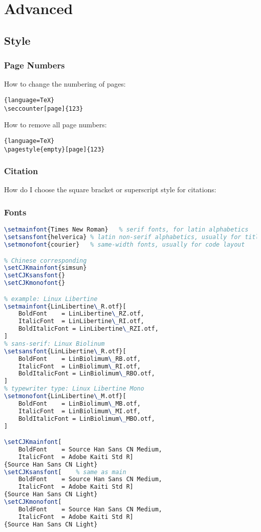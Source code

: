 \chapter{Advanced}
\label{chap:Advanced}

\section{Style}

\subsection{Page Numbers}
How to change the numbering of pages:
\begin{lstlisting}{language=TeX}
\seccounter[page]{123}
\end{lstlisting}

How to remove all page numbers:
\begin{lstlisting}{language=TeX}
\pagestyle{empty}[page]{123}
\end{lstlisting}

\subsection{Citation}
How do I choose the square bracket or superscript style for citations:

\subsection{Fonts}
\begin{lstlisting}[language=TeX]
\setmainfont{Times New Roman}	% serif fonts, for latin alphabetics
\setsansfont{helverica}	% latin non-serif alphabetics, usually for titles
\setmonofont{courier}	% same-width fonts, usually for code layout

% Chinese corresponding
\setCJKmainfont{simsun}
\setCJKsansfont{}
\setCJKmonofont{}   

% example: Linux Libertine
\setmainfont{LinLibertine\_R.otf}[
    BoldFont	= LinLibertine\_RZ.otf,
    ItalicFont	= LinLibertine\_RI.otf,
    BoldItalicFont = LinLibertine\_RZI.otf,
]
% sans-serif: Linux Biolinum
\setsansfont{LinLibertine\_R.otf}[
    BoldFont	= LinBiolimum\_RB.otf,
    ItalicFont	= LinBiolimum\_RI.otf,
    BoldItalicFont = LinBiolimum\_RBO.otf,
]
% typewriter type: Linux Libertine Mono
\setmonofont{LinLibertine\_M.otf}[
    BoldFont	= LinBiolimum\_MB.otf,
    ItalicFont	= LinBiolimum\_MI.otf,
    BoldItalicFont = LinBiolimum\_MBO.otf,
]

\setCJKmainfont[
    BoldFont	= Source Han Sans CN Medium,
    ItalicFont	= Adobe Kaiti Std R]
{Source Han Sans CN Light}
\setCJKsansfont[    % same as main
    BoldFont	= Source Han Sans CN Medium,
    ItalicFont	= Adobe Kaiti Std R]
{Source Han Sans CN Light}
\setCJKmonofont[
    BoldFont	= Source Han Sans CN Medium,
    ItalicFont	= Adobe Kaiti Std R]
{Source Han Sans CN Light}
\end{lstlisting}

